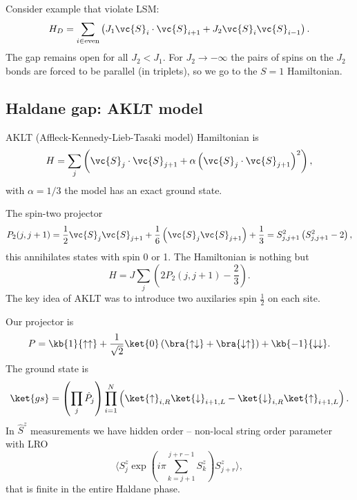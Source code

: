Consider example that violate LSM:
\begin{equation*}
	H_D = \sum_{i \in \text{even}} \left(J_1 \vc{S}_i \cdot \vc{S}_{i+1} + J_2 \vc{S}_i \vc{S}_{i-1}\right).
\end{equation*}
The gap remains open for all $J_2 < J_1$. For $J_2 \to - \infty$ the pairs of spins on the $J_2$ bonds are forced to be parallel (in triplets), so we go to the $S=1$ Hamiltonian.



\subsection*{Haldane gap: AKLT model}


AKLT (Affleck-Kennedy-Lieb-Tasaki model) Hamiltonian is
\begin{equation*}
	H = \sum_j \left(
		\vc{S}_j \cdot \vc{S}_{j+1} + \alpha \left(\vc{S}_j \cdot \vc{S}_{j+1}\right)^2
	\right),
\end{equation*}
with $\alpha=1/3$ the model has an exact ground state. 

The spin-two projector
\begin{equation*}
	P_2 (j, j+1) = \frac{1}{2} \vc{S}_j \vc{S}_{j+1} + \frac{1}{6}\left(\vc{S}_j \vc{S}_{j+1}\right) + \frac{1}{3} = S^2_{j,j+1} \left(
		S^2_{j,j+1}-2
	\right),
\end{equation*}
this annihilates states with spin 0 or 1.
The Hamiltonian	is nothing but
\begin{equation*}
	H = J \sum_j \left( 2 P_2 (j, j+1) - \frac{2}{3}\right).
\end{equation*}
The key idea of AKLT was to introduce two auxilaries spin $\frac{1}{2}$ on each site. 

Our projector is
\begin{equation*}
	P = \kb{1}{\uparrow \uparrow}  + \frac{1}{\sqrt{2}}\ket{0}\left(\bra{\uparrow \downarrow} + \bra{\downarrow \uparrow}\right) + \kb{-1}{\downarrow \downarrow}. 
\end{equation*}
The ground state is
\begin{equation*}
	\ket{gs} = \left(\prod_j \hat{P}_j\right) \prod_{i=1}^N \left(
		\ket{\uparrow}_{i,R} \ket{\downarrow}_{i+1,L} - \ket{\downarrow}_{i,R} \ket{\uparrow}_{i+1,L}
	\right).
\end{equation*}
In $\hat{S}^z$ measurements we have hidden order -- non-local string order parameter with LRO
\begin{equation*}
	\langle S^z_j \exp\left(i \pi \sum_{k=j+1}^{j+r-1} S_k^z\right) S^z_{j+r}\rangle,
\end{equation*}
that is finite in the entire Haldane phase.



